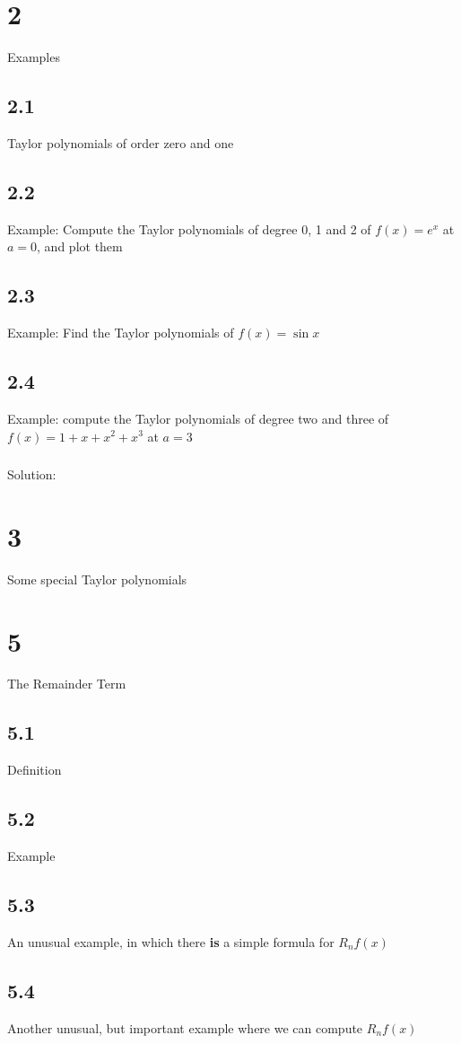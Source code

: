 \section{2}{Examples}
\subsection{2.1}{Taylor polynomials of order zero and one}
\subsection{2.2}{Example: Compute the Taylor polynomials of degree 0, 1 and 2 of $f (x)=e^x$ at $a=0$, and plot them}
\subsection{2.3}{Example: Find the Taylor polynomials of $f (x)=\sin x$}
\subsection{2.4}{Example: compute the Taylor polynomials of degree two and three of $f(x) = 1+x+x^2+x^3$ at $a=3$}
\subsubsection{}{Solution: }
\section{3}{Some special Taylor polynomials}

\section{5}{The Remainder Term}
\subsection{5.1}{Definition}
\subsection{5.2}{Example}
\subsection{5.3}{An unusual example, in which there {\bf is} a simple formula for $R_nf(x)$}
\subsection{5.4}{Another unusual, but important example where we can compute $R_nf(x)$}
